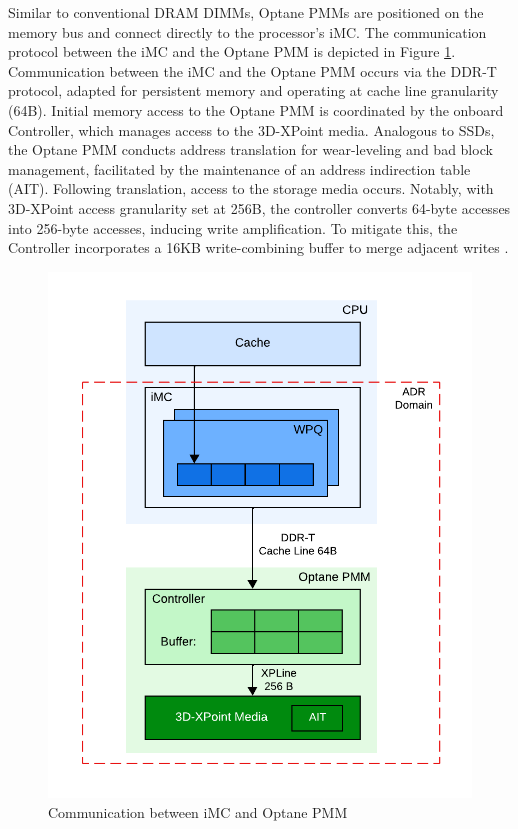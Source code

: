 Similar to conventional DRAM DIMMs, Optane PMMs are positioned on the memory bus and connect directly to the processor's iMC. The communication protocol between the iMC and the Optane PMM is depicted in Figure \ref{fig:optane_communication}.  Communication between the iMC and the Optane PMM occurs via the DDR-T protocol, adapted for persistent memory and operating at cache line granularity (64B). Initial memory access to the Optane PMM is coordinated by the onboard Controller, which manages access to the 3D-XPoint media. Analogous to SSDs, the Optane PMM conducts address translation for wear-leveling and bad block management, facilitated by the maintenance of an address indirection table (AIT). Following translation, access to the storage media occurs. Notably, with 3D-XPoint access granularity set at 256B, the controller converts 64-byte accesses into 256-byte accesses, inducing write amplification. To mitigate this, the Controller incorporates a 16KB write-combining buffer to merge adjacent writes \cite{yang2020empirical,izraelevitz2019basic,wu2020ribbon}.

\begin{figure}[ht]
    \centering
    \includegraphics[scale=0.7]{images/optane-communication.png}
    \caption{Communication between iMC and Optane PMM}
    \label{fig:optane_communication}
\end{figure}

